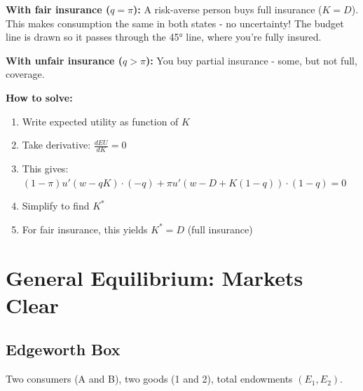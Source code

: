\documentclass[11pt]{article}
\begin{document}
\begin{intuition}
\textbf{With fair insurance ($q = \pi$):} A risk-averse person buys full insurance ($K = D$). This makes consumption the same in both states - no uncertainty! The budget line is drawn so it passes through the 45° line, where you're fully insured.

\textbf{With unfair insurance ($q > \pi$):} You buy partial insurance - some, but not full, coverage.
\end{intuition}

\begin{steps}
\textbf{How to solve:}
\begin{enumerate}
    \item Write expected utility as function of $K$
    \item Take derivative: $\frac{dEU}{dK} = 0$
    \item This gives: $(1-\pi) u'(w-qK) \cdot (-q) + \pi u'(w-D+K(1-q)) \cdot (1-q) = 0$
    \item Simplify to find $K^*$
    \item For fair insurance, this yields $K^* = D$ (full insurance)
\end{enumerate}
\end{steps}

\section{General Equilibrium: Markets Clear}

\subsection{Edgeworth Box}

Two consumers (A and B), two goods (1 and 2), total endowments $(E_1, E_2)$.

\begin{center}
\end{center}
\end{document}
